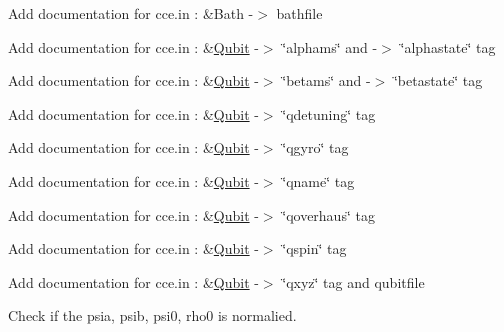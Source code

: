 \begin{DoxyRefList}
Add documentation for cce.\-in \-: \&Bath -\/$>$ bathfile  
\item[\label{todo__todo000021}%
\hypertarget{todo__todo000021}{}%
Member \hyperlink{structQubit_accc3b309d802ab6f269b7d8a7536a4a0}{Qubit\-:\-:alpha} ]Add documentation for cce.\-in \-: \&\hyperlink{structQubit}{Qubit} -\/$>$ \char`\"{}alphams\char`\"{} and -\/$>$ \char`\"{}alphastate\char`\"{} tag  
\item[\label{todo__todo000022}%
\hypertarget{todo__todo000022}{}%
Member \hyperlink{structQubit_a6c73eb8c49fdb6db06179b21b5a2923d}{Qubit\-:\-:beta} ]Add documentation for cce.\-in \-: \&\hyperlink{structQubit}{Qubit} -\/$>$ \char`\"{}betams\char`\"{} and -\/$>$ \char`\"{}betastate\char`\"{} tag  
\item[\label{todo__todo000019}%
\hypertarget{todo__todo000019}{}%
Member \hyperlink{structQubit_a6e0e926587994ef24d67431d0dbef9e7}{Qubit\-:\-:detuning} ]Add documentation for cce.\-in \-: \&\hyperlink{structQubit}{Qubit} -\/$>$ \char`\"{}qdetuning\char`\"{} tag  
\item[\label{todo__todo000017}%
\hypertarget{todo__todo000017}{}%
Member \hyperlink{structQubit_a668a62d3ddf72e6b9acbc6338c97090f}{Qubit\-:\-:gyro} ]Add documentation for cce.\-in \-: \&\hyperlink{structQubit}{Qubit} -\/$>$ \char`\"{}qgyro\char`\"{} tag  
\item[\label{todo__todo000015}%
\hypertarget{todo__todo000015}{}%
Member \hyperlink{structQubit_ab65a0dfa0efbd8a7862403f4704c1587}{Qubit\-:\-:name} \mbox{[}M\-A\-X\-\_\-\-C\-H\-A\-R\-A\-R\-R\-A\-Y\-\_\-\-L\-E\-N\-G\-T\-H\mbox{]}]Add documentation for cce.\-in \-: \&\hyperlink{structQubit}{Qubit} -\/$>$ \char`\"{}qname\char`\"{} tag  
\item[\label{todo__todo000020}%
\hypertarget{todo__todo000020}{}%
Member \hyperlink{structQubit_aecb3943042094c4be043f375626dbd24}{Qubit\-:\-:overhaus} ]Add documentation for cce.\-in \-: \&\hyperlink{structQubit}{Qubit} -\/$>$ \char`\"{}qoverhaus\char`\"{} tag  
\item[\label{todo__todo000016}%
\hypertarget{todo__todo000016}{}%
Member \hyperlink{structQubit_a858930b7d9d9cafc70f26ab7993dadad}{Qubit\-:\-:spin} ]Add documentation for cce.\-in \-: \&\hyperlink{structQubit}{Qubit} -\/$>$ \char`\"{}qspin\char`\"{} tag  
\item[\label{todo__todo000018}%
\hypertarget{todo__todo000018}{}%
Member \hyperlink{structQubit_a799cb32b473160eb8e9e4aa6c9c39b18}{Qubit\-:\-:xyz} \mbox{[}3\mbox{]}]Add documentation for cce.\-in \-: \&\hyperlink{structQubit}{Qubit} -\/$>$ \char`\"{}qxyz\char`\"{} tag and qubitfile  
\item[\label{todo__todo000013}%
\hypertarget{todo__todo000013}{}%
Class \hyperlink{structQubitArray}{Qubit\-Array} ]Check if the psia, psib, psi0, rho0 is normalied. 


\end{DoxyRefList}
